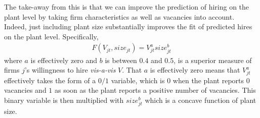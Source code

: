 The take-away from this is that we can improve the prediction of hiring on the plant level by taking firm characteristics as well as vacancies into account. Indeed, just including plant size substantially improves the fit of predicted hires on the plant level. Specifically,
\begin{align}
F(V_{jt}, size_{jt})=V_{jt}^{a} size_{jt}^{b}
\end{align}
where $a$ is effectively zero and $b$ is between $0.4$ and $0.5$, is a superior measure of firms $j$'s willingness to hire \emph{vis-a-vis} $V$. That $a$ is effectively zero means that $V_{jt}^{a}$ effectively takes the form of a $0/1$ variable, which is $0$ when the plant reports $0$ vacancies and $1$ as soon as the plant reports a positive number of vacancies. This binary variable is then multiplied with $size_{jt}^{b}$ which is a concave function of plant size.

